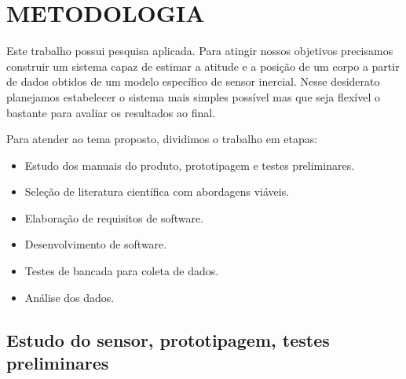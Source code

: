 \chapter{METODOLOGIA}\label{chap:metodologia}

Este trabalho possui pesquisa aplicada. Para atingir nossos objetivos precisamos construir um sistema capaz de estimar a atitude e a posição de um corpo a partir de dados obtidos de um modelo específico de sensor inercial. Nesse desiderato planejamos estabelecer o sistema mais simples possível mas que seja flexível o bastante para avaliar os resultados ao final.

Para atender ao tema proposto, dividimos o trabalho em etapas:
\begin{itemize}
    \item Estudo dos manuais do produto, prototipagem e testes preliminares.
    \item Seleção de literatura científica com abordagens viáveis.
    \item Elaboração de requisitos de software.
    \item Desenvolvimento de software.
    \item Testes de bancada para coleta de dados.
    \item Análise dos dados.
\end{itemize}

\section{Estudo do sensor, prototipagem, testes preliminares}

